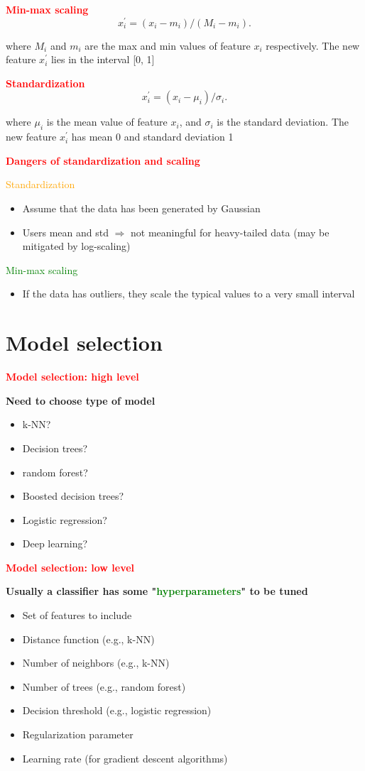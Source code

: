 \documentclass[11pt]{article}
\begin{document}
\textcolor{red}{\textbf{Min-max scaling}}
\[
x_i^{'} = (x_i - m_i)/(M_i - m_i)
.\] 

where $M_i$ and $m_i$ are the max and min values of feature $x_i$ respectively. The new feature $x_i^{'}$ lies in the interval [0, 1]

\textcolor{red}{\textbf{Standardization}}
\[
x_i^{'} = (x_i - \mu_i)/\sigma_i
.\] 

where $\mu_i$ is the mean value of feature $x_i$, and $\sigma_i$ is the standard deviation. The new feature $x_i^{'}$ has mean 0 and standard deviation 1

\textcolor{red}{\textbf{Dangers of standardization and scaling}}

\textcolor{orange}{Standardization}
\begin{itemize}
	\item Assume that the data has been generated by Gaussian
	\item Users mean and std $\Rightarrow$ not meaningful for heavy-tailed data (may be mitigated by log-scaling)
\end{itemize}
\textcolor{green}{Min-max scaling}
\begin{itemize}
	\item If the data has outliers, they scale the typical values to a very small interval
\end{itemize}

\section*{Model selection}

\textcolor{red}{\textbf{Model selection: high level}}

\textbf{Need to choose type of model}
\begin{itemize}
	\item k-NN?
	\item Decision trees?
	\item random forest?
	\item Boosted decision trees?
	\item Logistic regression?
	\item Deep learning?
\end{itemize}

\textbf{\textcolor{red}{Model selection: low level}}

\textbf{Usually a classifier has some "\textcolor{green}{hyperparameters}" to be tuned}
\begin{itemize}
	\item Set of features to include
	\item Distance function (e.g., k-NN)
	\item Number of neighbors (e.g., k-NN)
	\item Number of trees (e.g., random forest)
	\item Decision threshold (e.g., logistic regression)
	\item Regularization parameter
	\item Learning rate (for gradient descent algorithms)
\end{itemize}
\end{document}
